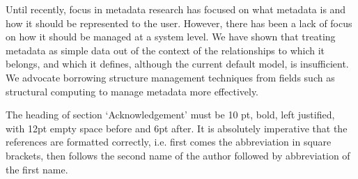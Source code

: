 \documentclass[10pt, a4paper, oneside]{article}
\begin{document}
Until recently, focus in metadata research has focused on what
metadata is and how it should be represented to the user.  However,
there has been a lack of focus on how it should be managed at a system
level.  We have shown that treating metadata as simple data out of the
context of the relationships to which it belongs, and which it
defines, although the current default model, is insufficient.  We
advocate borrowing structure management techniques from fields such as
structural computing to manage metadata more effectively.

\begin{Acknowledgements}
The heading of section ‘Acknowledgement’ must be 10 pt, bold, left justified, with 12pt empty space before and 6pt after. It is absolutely imperative that the references are formatted correctly, i.e. first comes the abbreviation in square brackets, then follows the second name of the author followed by abbreviation of the first name.
\end{Acknowledgements}
\end{document}
